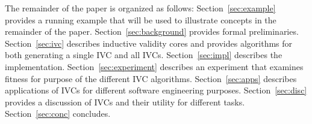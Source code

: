 The remainder of the paper is organized as follows: Section~\ref{sec:example} provides a running example that will be used to illustrate concepts in the remainder of the paper.  Section~\ref{sec:background} provides formal preliminaries.  Section~\ref{sec:ivc} describes inductive validity cores and provides algorithms for both generating a single IVC and all IVCs.  Section~\ref{sec:impl} describes the implementation.  Section~\ref{sec:experiment} describes an experiment that examines fitness for purpose of the different IVC algorithms.  Section~\ref{sec:apps} describes applications of IVCs for different software engineering purposes.   Section~\ref{sec:disc} provides a discussion of IVCs and their utility for different tasks.  Section~\ref{sec:conc} concludes.


